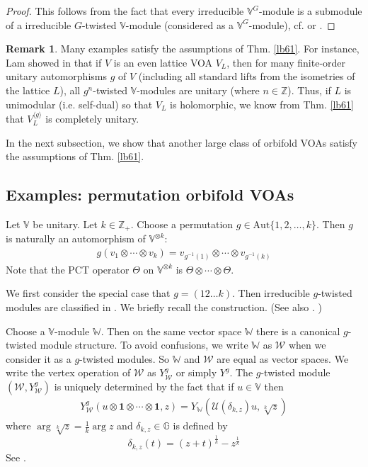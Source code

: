 \documentclass[11pt,b5paper,notitlepage]{article}
\theoremstyle{definition}
\newtheorem{rem}[df]{Remark}
\theoremstyle{plain}
\newcommand{\mc}{\mathcal}
\newcommand{\id}{\mathbf{1}}
\newcommand{\bk}[1]{\langle {#1}\rangle}
\newcommand{\Vbb}{\mathbb V}
\newcommand{\Wbb}{\mathbb W}
\newcommand{\Gbb}{\mathbb G}
\newcommand{\Zbb}{\mathbb Z}
\newcommand{\Aut}{\mathrm{Aut}}
\numberwithin{equation}{section}
\begin{document}
\begin{proof}
This follows from the fact that every irreducible $\Vbb^G$-module is a submodule of a irreducible $G$-twisted $\Vbb$-module (considered as a $\Vbb^G$-module), cf. \cite{DRX17} or \cite{McR21}.
\end{proof}
 


\begin{rem}
Many examples satisfy the assumptions of Thm. \ref{lb61}. For instance, Lam showed in \cite{Lam23} that if $V$ is an even lattice VOA $V_L$, then for many finite-order unitary automorphisms $g$ of $V$ (including all standard lifts from the isometries of the lattice $L$), all $g^n$-twisted $\Vbb$-modules are unitary (where $n\in\Zbb$). Thus, if $L$ is unimodular (i.e. self-dual) so that $V_L$ is holomorphic, we know from Thm. \ref{lb61} that $V_L^{\bk{g}}$ is completely unitary.
\end{rem}



In the next subsection, we show that another large class of orbifold VOAs satisfy the assumptions of Thm. \ref{lb61}.




\subsection{Examples: permutation orbifold VOAs}



Let $\Vbb$ be unitary. Let $k\in\Zbb_+$. Choose a permutation $g\in\Aut\{1,2,\dots,k\}$. Then $g$ is naturally an automorphism of $\Vbb^{\otimes k}$:
\begin{align*}
g(v_1\otimes\cdots\otimes v_k)=v_{g^{-1}(1)}\otimes\cdots\otimes v_{g^{-1}(k)}
\end{align*}
Note that the PCT operator $\Theta$ on $\Vbb^{\otimes k}$ is $\Theta\otimes\cdots\otimes\Theta$.

We first consider the special case that $g=(12\dots k)$. Then irreducible $g$-twisted modules are classified in \cite{BDM02}. We briefly recall the construction. (See also \cite[Sec. 10]{Gui21}. )

Choose a $\Vbb$-module $\Wbb$. Then on the same vector space $\Wbb$ there is a canonical $g$-twisted module structure. To avoid confusions, we write $\Wbb$ as $\mc W$ when we consider it as a $g$-twisted modules. So $\Wbb$ and $\mc W$ are equal as vector spaces. We write the vertex operation of $\mc W$ as $Y_{\mc W}^g$ or simply $Y^g$. The $g$-twisted module $(\mc W,Y_{\mc W}^g)$ is uniquely determined by the fact that if $u\in\Vbb$ then
\begin{align*}
Y^g_{\mc W}(u\otimes\id\otimes\cdots\otimes \id,z)=Y_\Wbb(\mc U(\delta_{k,z})u,\sqrt[k]z)
\end{align*}
where $\arg\sqrt[k]z=\frac 1k\arg z$ and $\delta_{k,z}\in\Gbb$ is defined by
\begin{equation*}
\delta_{k,z}(t)=(z+t)^{\frac 1k}-z^{\frac 1k}
\end{equation*}
See \cite[Thm. 3.9]{BDM02}. 
\end{document}
